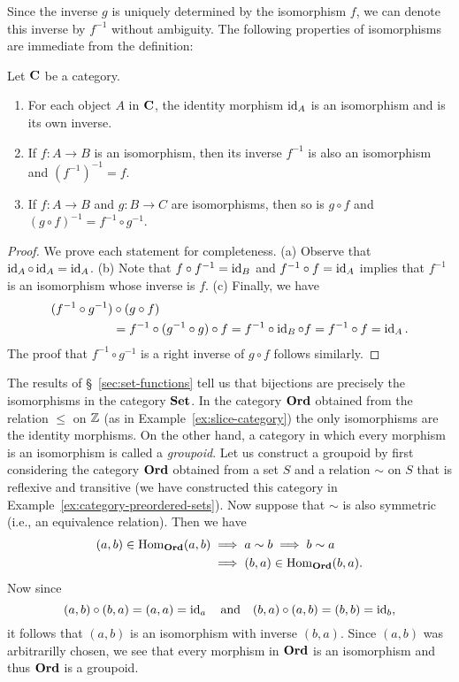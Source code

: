 Since the inverse \(g\) is uniquely determined by the isomorphism \(f\), we can
denote this inverse by \(f^{-1}\) without ambiguity. The following properties of
isomorphisms are immediate from the definition:

\begin{theorem}
    Let \(\mathbf{C}\) be a category.
    \begin{enumerate}[label=(\alph*), itemsep=0pt]
        \item For each object \(A\) in \(\mathbf{C}\), the identity morphism
        \(\operatorname{id}_A\) is an isomorphism and is its own inverse.
        \item If \(f: A \to B\) is an isomorphism, then its inverse \(f^{-1}\)
        is also an isomorphism and \((f^{-1})^{-1} = f\).
        \item If \(f : A \to B\) and \(g : B \to C\) are isomorphisms, then so
        is \(g \circ f\) and \((g \circ f)^{-1} = f^{-1} \circ g^{-1}\).
    \end{enumerate}
\end{theorem}

\begin{proof}
    We prove each statement for completeness. (a) Observe that \(\operatorname{id}_A \circ
    \operatorname{id}_A = \operatorname{id}_A\). (b) Note that \(f \circ f^{-1} = \operatorname{id}_B\) and \(f^{-1} \circ
    f = \operatorname{id}_A\) implies that \(f^{-1}\) is an isomorphism whose inverse is
    \(f\). (c) Finally, we have
    \begin{align*}
        (f^{-1} \circ g^{-1}) &\circ (g \circ f)\\
        &= f^{-1} \circ (g^{-1} \circ g) \circ f = f^{-1} \circ \operatorname{id}_B \circ f = f^{-1} \circ f = \operatorname{id}_A.
    \end{align*}
    The proof that \(f^{-1} \circ g^{-1}\) is a right inverse of \(g \circ f\)
    follows similarly.
\end{proof}

The results of \S~\ref{sec:set-functions} tell us that bijections are precisely
the isomorphisms in the category \(\mathbf{Set}\). In the category \(\mathbf{Ord}\)
obtained from the relation \(\leq\) on \(\mathbb{Z}\) (as in
Example~\ref{ex:slice-category}) the only isomorphisms are the identity
morphisms. On the other hand, a category in which every morphism is an
isomorphism is called a \emph{groupoid}. Let us construct a groupoid by first
considering the category \(\mathbf{Ord}\) obtained from a set \(S\) and a relation
\(\sim\) on \(S\) that is reflexive and transitive (we have constructed this
category in Example~\ref{ex:category-preordered-sets}). Now suppose that
\(\sim\) is also symmetric (i.e., an equivalence relation). Then we have
\begin{align*}
    (a, b) \in \operatorname{Hom}_{\mathbf{Ord}}(a, b) &\implies a \sim b \implies b \sim a\\ &\implies (b, a) \in \operatorname{Hom}_{\mathbf{Ord}}(b, a).
\end{align*}
Now since
\[
    (a, b) \circ (b, a) = (a, a) = \operatorname{id}_a \quad \text{and} \quad (b, a) \circ (a, b) = (b, b) = \operatorname{id}_b,
\]
it follows that \((a, b)\) is an isomorphism with inverse \((b, a)\). Since
\((a, b)\) was arbitrarilly chosen, we see that every morphism in \(\mathbf{Ord}\)
is an isomorphism and thus \(\mathbf{Ord}\) is a groupoid.

